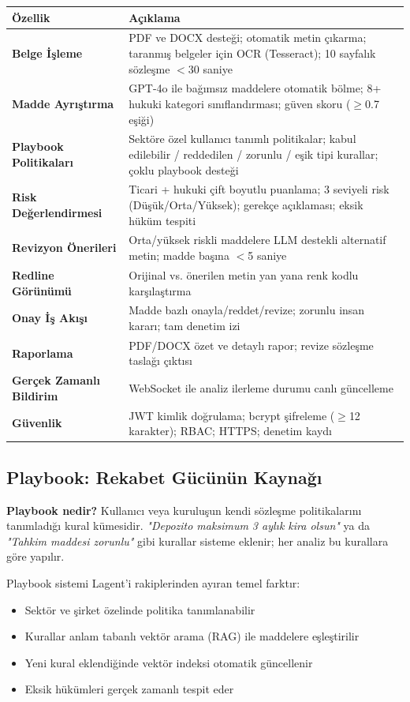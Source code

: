 \documentclass[12pt,a4paper]{article}
\begin{document}
\begin{longtable}{>{\bfseries\color{primary}}p{4.5cm} p{9.5cm}}
\toprule
\textbf{\color{dark}Özellik} & \textbf{\color{dark}Açıklama} \\
\midrule
\endhead
Belge İşleme & PDF ve DOCX desteği; otomatik metin çıkarma; taranmış belgeler için OCR (Tesseract); 10 sayfalık sözleşme $<$30 saniye \\[4pt]
Madde Ayrıştırma & GPT-4o ile bağımsız maddelere otomatik bölme; 8+ hukuki kategori sınıflandırması; güven skoru ($\geq$0.7 eşiği) \\[4pt]
Playbook Politikaları & Sektöre özel kullanıcı tanımlı politikalar; kabul edilebilir / reddedilen / zorunlu / eşik tipi kurallar; çoklu playbook desteği \\[4pt]
Risk Değerlendirmesi & Ticari + hukuki çift boyutlu puanlama; 3 seviyeli risk (Düşük/Orta/Yüksek); gerekçe açıklaması; eksik hüküm tespiti \\[4pt]
Revizyon Önerileri & Orta/yüksek riskli maddelere LLM destekli alternatif metin; madde başına $<$5 saniye \\[4pt]
Redline Görünümü & Orijinal vs. önerilen metin yan yana renk kodlu karşılaştırma \\[4pt]
Onay İş Akışı & Madde bazlı onayla/reddet/revize; zorunlu insan kararı; tam denetim izi \\[4pt]
Raporlama & PDF/DOCX özet ve detaylı rapor; revize sözleşme taslağı çıktısı \\[4pt]
Gerçek Zamanlı Bildirim & WebSocket ile analiz ilerleme durumu canlı güncelleme \\[4pt]
Güvenlik & JWT kimlik doğrulama; bcrypt şifreleme ($\geq$12 karakter); RBAC; HTTPS; denetim kaydı \\
\bottomrule
\end{longtable}

\subsection{Playbook: Rekabet Gücünün Kaynağı}

\begin{highlightbox}
\textbf{\color{primary}Playbook nedir?} Kullanıcı veya kuruluşun kendi sözleşme politikalarını
tanımladığı kural kümesidir. \emph{"Depozito maksimum 3 aylık kira olsun"} ya da \emph{"Tahkim
maddesi zorunlu"} gibi kurallar sisteme eklenir; her analiz bu kurallara göre yapılır.
\end{highlightbox}

Playbook sistemi Lagent'i rakiplerinden ayıran temel farktır:
\begin{itemize}[itemsep=3pt]
  \item Sektör ve şirket özelinde politika tanımlanabilir
  \item Kurallar anlam tabanlı vektör arama (RAG) ile maddelere eşleştirilir
  \item Yeni kural eklendiğinde vektör indeksi otomatik güncellenir
  \item Eksik hükümleri gerçek zamanlı tespit eder
\end{itemize}
\end{document}
